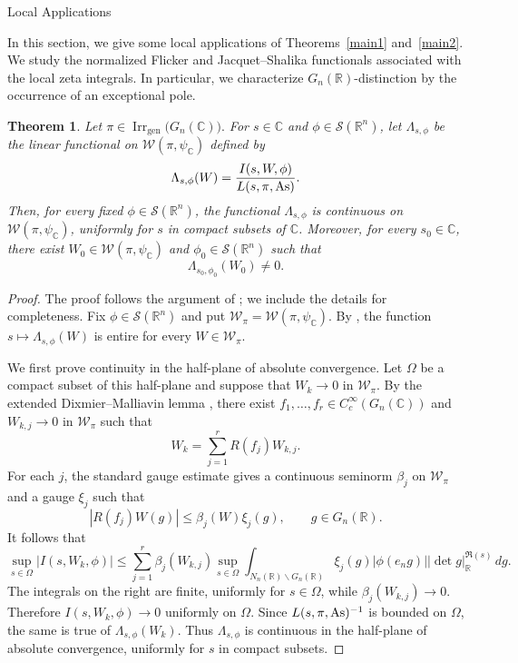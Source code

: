 \documentclass[12pt,reqno]{amsart}
\numberwithin{equation}{section}%
\numberwithin{equation}{subsection}
\newtheorem{thm}[equation]{Theorem}%
\theoremstyle{definition}
\theoremstyle{remark}
\begin{document}
\begin{section}{Local Applications}\label{s6}

In this section, we give some local applications of
Theorems~\ref{main1} and~\ref{main2}. We study the normalized Flicker
and Jacquet--Shalika functionals associated with the local zeta
integrals. In particular, we characterize
\(G_n(\mathbb{R})\)-distinction by the occurrence of an exceptional
pole.



\begin{thm}\label{continuity}
Let
$
\pi\in\operatorname{Irr}_{\mathrm{gen}}
\bigl(G_n(\mathbb{C})\bigr).
$
For \(s\in\mathbb{C}\) and
\(\phi\in\mathcal{S}(\mathbb{R}^n)\), let
\(\Lambda_{s,\phi}\) be the linear functional on
\(\mathcal{W}(\pi,\psi_{\mathbb{C}})\) defined by
\[
\Lambda_{s,\phi}(W)
=
\frac{I(s,W,\phi)}{L(s,\pi,{\rm As})}.
\]
Then, for every fixed \(\phi\in\mathcal{S}(\mathbb{R}^n)\), the
functional \(\Lambda_{s,\phi}\) is continuous on
\(\mathcal{W}(\pi,\psi_{\mathbb{C}})\), uniformly for \(s\) in compact
subsets of \(\mathbb{C}\). Moreover, for every \(s_0\in\mathbb{C}\), there exist
\(W_0\in\mathcal{W}(\pi,\psi_{\mathbb{C}})\) and
\(\phi_0\in\mathcal{S}(\mathbb{R}^n)\) such that
\[
\Lambda_{s_0,\phi_0}(W_0)\neq 0.
\]
\end{thm}

\begin{proof}
The proof follows the argument of \cite[Theorem~1.1]{CPS2004}; we include the details for completeness. Fix \(\phi\in\mathcal{S}(\mathbb{R}^n)\) and put
\(\mathcal{W}_{\pi}=\mathcal{W}(\pi,\psi_{\mathbb{C}})\).
By \cite[Theorem~1(iii)]{BP2021}, the function
\(s\mapsto\Lambda_{s,\phi}(W)\) is entire for every
\(W\in\mathcal{W}_{\pi}\).

We first prove continuity in the half-plane of absolute convergence.
Let \(\Omega\) be a compact subset of this half-plane and suppose that
\(W_k\to0\) in \(\mathcal{W}_{\pi}\). By the extended
Dixmier--Malliavin lemma \cite[Proposition~1.1]{CPS2004}, there exist
\(f_1,\ldots,f_r\in C_c^\infty(G_n(\mathbb{C}))\) and
\(W_{k,j}\to0\) in \(\mathcal{W}_{\pi}\) such that
\[
W_k=\sum_{j=1}^rR(f_j)W_{k,j}.
\]
For each \(j\), the standard gauge estimate gives a continuous
seminorm \(\beta_j\) on \(\mathcal{W}_{\pi}\) and a gauge \(\xi_j\)
such that
\[
|R(f_j)W(g)|\leq\beta_j(W)\xi_j(g),
\qquad g\in G_n(\mathbb{R}).
\]
It follows that
\[
\sup_{s\in\Omega}|I(s,W_k,\phi)|
\leq
\sum_{j=1}^r\beta_j(W_{k,j})
\sup_{s\in\Omega}
\int_{N_n(\mathbb{R})\backslash G_n(\mathbb{R})}
\xi_j(g)|\phi(e_ng)|
|\det g|_{\mathbb{R}}^{\Re(s)}\,dg.
\]
The integrals on the right are finite, uniformly for
\(s\in\Omega\), while \(\beta_j(W_{k,j})\to0\). Therefore
\(I(s,W_k,\phi)\to0\) uniformly on \(\Omega\). Since
\(L(s,\pi,{\rm As})^{-1}\) is bounded on \(\Omega\), the same is true of
\(\Lambda_{s,\phi}(W_k)\). Thus \(\Lambda_{s,\phi}\) is continuous in
the half-plane of absolute convergence, uniformly for \(s\) in
compact subsets.


\end{proof}
\end{section}
\end{document}
